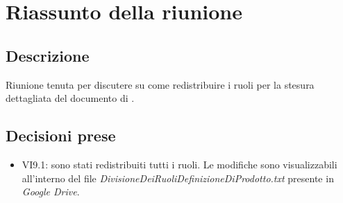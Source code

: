 \section{Riassunto della riunione}
\subsection{Descrizione}

Riunione tenuta per discutere su come redistribuire i ruoli per la stesura dettagliata del documento di \DdPv.

\subsection{Decisioni prese}
\begin{itemize}
\item VI9.1: sono stati redistribuiti tutti i ruoli. Le modifiche sono visualizzabili all'interno del file \textit{DivisioneDeiRuoliDefinizioneDiProdotto.txt} presente in \textit{Google Drive}.
\end{itemize}
